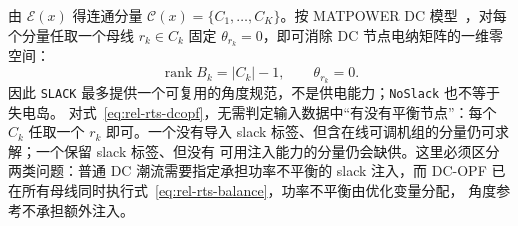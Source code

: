 由 $\mathcal E(x)$ 得连通分量 $\mathcal C(x)=\{C_1,\ldots,C_K\}$。按 MATPOWER DC 模型~\cite{rel:zimmerman}，对每个分量任取一个母线
$r_k\in C_k$ 固定 $\theta_{r_k}=0$，即可消除 DC 节点电纳矩阵的一维零空间：
\begin{equation}
 \operatorname{rank} B_k=|C_k|-1,\qquad \theta_{r_k}=0.
 \label{eq:rel-rts-angle-reference}
\end{equation}
因此 \texttt{SLACK} 最多提供一个可复用的角度规范，不是供电能力；\texttt{NoSlack} 也不等于失电岛。
对式~\eqref{eq:rel-rts-dcopf}，无需判定输入数据中“有没有平衡节点”：每个 $C_k$ 任取一个
$r_k$ 即可。一个没有导入 slack 标签、但含在线可调机组的分量仍可求解；一个保留 slack 标签、但没有
可用注入能力的分量仍会缺供。这里必须区分两类问题：普通 DC 潮流需要指定承担功率不平衡的 slack
注入，而 DC-OPF 已在所有母线同时执行式~\eqref{eq:rel-rts-balance}，功率不平衡由优化变量分配，
角度参考不承担额外注入。

